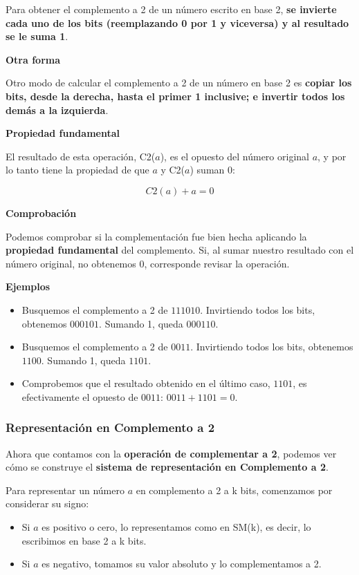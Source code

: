 \documentclass[spanish,A4,]{article}
\begin{document}
Para obtener el complemento a 2 de un número escrito en base 2,
\textbf{se invierte cada uno de los bits (reemplazando 0 por 1 y
viceversa) y al resultado se le suma 1}.

\textbf{Otra forma}

Otro modo de calcular el complemento a 2 de un número en base 2 es
\textbf{copiar los bits, desde la derecha, hasta el primer 1 inclusive;
e invertir todos los demás a la izquierda}.

\textbf{Propiedad fundamental}

El resultado de esta operación, C2($a$), es el opuesto del número
original $a$, y por lo tanto tiene la propiedad de que $a$ y C2($a$)
suman 0:

\[C2(a) + a = 0\]

\textbf{Comprobación}

Podemos comprobar si la complementación fue bien hecha aplicando la
\textbf{propiedad fundamental} del complemento. Si, al sumar nuestro
resultado con el número original, no obtenemos 0, corresponde revisar la
operación.

\textbf{Ejemplos}

\begin{itemize}
\itemsep1pt\parskip0pt
\item
  Busquemos el complemento a 2 de $111010$. Invirtiendo todos los bits,
  obtenemos $000101$. Sumando 1, queda $000110$.
\item
  Busquemos el complemento a 2 de $0011$. Invirtiendo todos los bits,
  obtenemos $1100$. Sumando 1, queda $1101$.
\item
  Comprobemos que el resultado obtenido en el último caso, $1101$, es
  efectivamente el opuesto de $0011$: $0011 + 1101 = 0$.
\end{itemize}

\subsubsection{Representación en Complemento a
2}\label{representaciuxf3n-en-complemento-a-2}

Ahora que contamos con la \textbf{operación de complementar a 2},
podemos ver cómo se construye el \textbf{sistema de representación en
Complemento a 2}.

Para representar un número $a$ en complemento a 2 a k bits, comenzamos
por considerar su signo:

\begin{itemize}
\itemsep1pt\parskip0pt
\item
  Si $a$ es positivo o cero, lo representamos como en SM(k), es decir,
  lo escribimos en base 2 a k bits.
\item
  Si $a$ es negativo, tomamos su valor absoluto y lo complementamos a 2.
\end{itemize}
\end{document}

